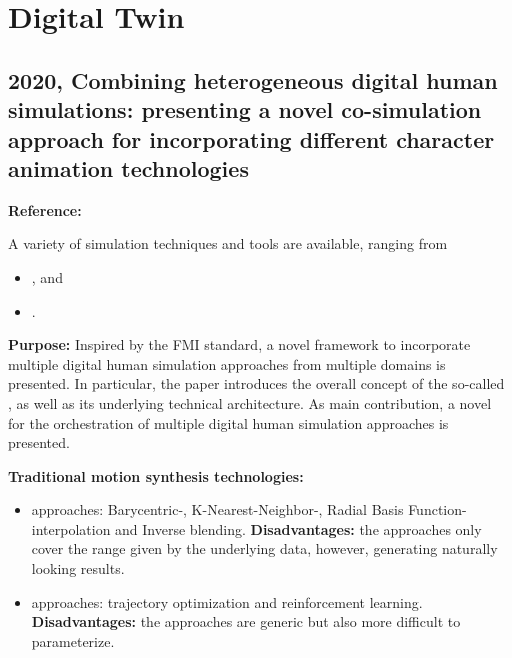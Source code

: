 \section{Digital Twin}

\crule

\subsection{2020, Combining heterogeneous digital human simulations: presenting 
  a novel co-simulation approach for incorporating different character 
  animation technologies}

\textbf{Reference:} \cite{gaisbauer2020combining}

A variety of simulation techniques and tools are available, ranging from 
\vspace{-.5cm}
\begin{itemize}
  \item {}, and
  \item {}.
\end{itemize}


\textbf{Purpose:}
Inspired by the FMI standard, a novel framework to incorporate multiple digital 
human simulation approaches from multiple domains is presented. 
In particular, the paper introduces the overall concept of the so-called 
, as well as its underlying technical architecture.
As main contribution, a novel  for the 
orchestration of multiple digital human simulation approaches is presented.

\textbf{Traditional motion synthesis technologies:}
\vspace{-.5cm}
\begin{itemize}
  \item {} approaches: Barycentric-, K-Nearest-Neighbor-,
    Radial Basis Function- interpolation and Inverse blending.
    \textbf{Disadvantages:} the approaches only cover the range given 
    by the underlying data, however, generating naturally looking results.
  \item {} approaches: trajectory optimization and 
    reinforcement learning.
    \textbf{Disadvantages:} the approaches are generic but also more difficult
    to parameterize. 
\end{itemize}

\crule